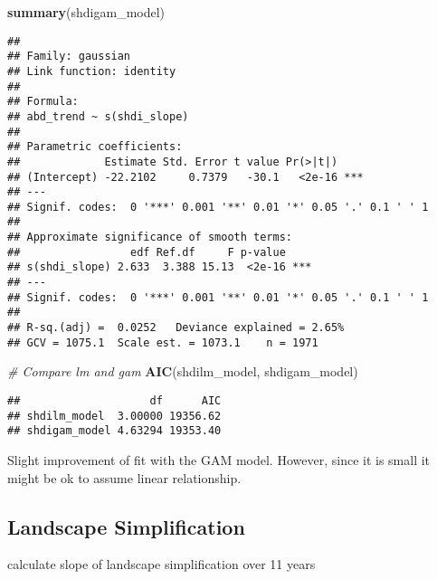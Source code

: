 \documentclass[
]{article}
\newenvironment{Shaded}{\begin{snugshade}}{\end{snugshade}}
\newcommand{\CommentTok}[1]{\textcolor[rgb]{0.56,0.35,0.01}{\textit{#1}}}
\newcommand{\FunctionTok}[1]{\textcolor[rgb]{0.13,0.29,0.53}{\textbf{#1}}}
\newcommand{\NormalTok}[1]{#1}
\begin{document}
\begin{Shaded}
\begin{Highlighting}[]
\FunctionTok{summary}\NormalTok{(shdigam\_model)}
\end{Highlighting}
\end{Shaded}

\begin{verbatim}
## 
## Family: gaussian 
## Link function: identity 
## 
## Formula:
## abd_trend ~ s(shdi_slope)
## 
## Parametric coefficients:
##             Estimate Std. Error t value Pr(>|t|)    
## (Intercept) -22.2102     0.7379   -30.1   <2e-16 ***
## ---
## Signif. codes:  0 '***' 0.001 '**' 0.01 '*' 0.05 '.' 0.1 ' ' 1
## 
## Approximate significance of smooth terms:
##                 edf Ref.df     F p-value    
## s(shdi_slope) 2.633  3.388 15.13  <2e-16 ***
## ---
## Signif. codes:  0 '***' 0.001 '**' 0.01 '*' 0.05 '.' 0.1 ' ' 1
## 
## R-sq.(adj) =  0.0252   Deviance explained = 2.65%
## GCV = 1075.1  Scale est. = 1073.1    n = 1971
\end{verbatim}

\begin{Shaded}
\begin{Highlighting}[]
\CommentTok{\# Compare lm and gam}
\FunctionTok{AIC}\NormalTok{(shdilm\_model, shdigam\_model)}
\end{Highlighting}
\end{Shaded}

\begin{verbatim}
##                    df      AIC
## shdilm_model  3.00000 19356.62
## shdigam_model 4.63294 19353.40
\end{verbatim}

Slight improvement of fit with the GAM model. However, since it is small
it might be ok to assume linear relationship.

\subsection{Landscape Simplification}\label{landscape-simplification}

calculate slope of landscape simplification over 11 years
\end{document}
